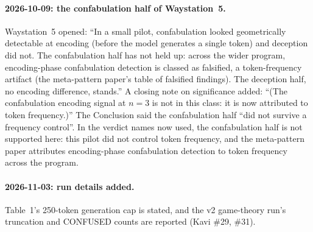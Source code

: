 \documentclass[11pt,a4paper]{article}
\begin{document}
\paragraph{2026-10-09: the confabulation half of Waystation~5.}
Waystation~5 opened: ``In a small pilot, confabulation looked
geometrically detectable at encoding (before the model generates a
single token) and deception did not. The confabulation half has not
held up: across the wider program, encoding-phase confabulation
detection is classed as falsified, a token-frequency artifact (the
meta-pattern paper's table of falsified findings). The deception half,
no encoding difference, stands.'' A closing note on significance added:
``(The confabulation encoding signal at $n = 3$ is not in this class:
it is now attributed to token frequency.)'' The Conclusion said the
confabulation half ``did not survive a frequency control''. In the
verdict names now used, the confabulation half is not supported here:
this pilot did not control token frequency, and the meta-pattern paper
attributes encoding-phase confabulation detection to token frequency
across the program.

\paragraph{2026-11-03: run details added.}
Table~1's 250-token generation cap is stated, and the v2 game-theory
run's truncation and CONFUSED counts are reported (Kavi \#29, \#31).
\end{document}

